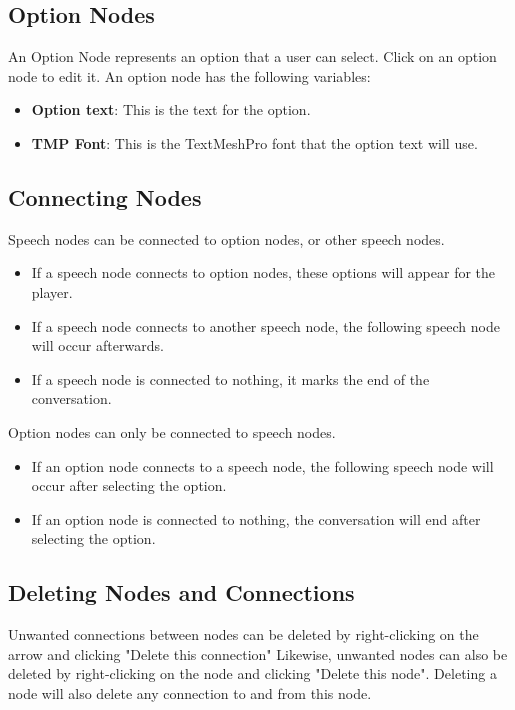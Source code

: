 \documentclass[a4paper,12pt]{article}
\begin{document}
\newpage

\subsection{Option Nodes}
An Option Node represents an option that a user can select.
\newline
Click on an option node to edit it. An option node has the following variables:

\begin{itemize}
\setlength\itemsep{1pt}
	\item \textbf{Option text}: This is the text for the option.
	\item \textbf{TMP Font}: This is the TextMeshPro font that the option text will use.
\end{itemize}

\subsection{Connecting Nodes}

Speech nodes can be connected to option nodes, or other speech nodes. 

\begin{itemize}
\setlength\itemsep{1pt}
	\item If a speech node connects to option nodes, these options will appear for the player.
	\item If a speech node connects to another speech node, the following speech node will occur afterwards.
	\item If a speech node is connected to nothing, it marks the end of the conversation.
\end{itemize}
\bigbreak

Option nodes can only be connected to speech nodes.
\begin{itemize}
\setlength\itemsep{1pt}
	\item If an option node connects to a speech node, the following speech node will occur after selecting the option.
	\item If an option node is connected to nothing, the conversation will end after selecting the option.	
\end{itemize}

\subsection{Deleting Nodes and Connections}
Unwanted connections between nodes can be deleted by right-clicking on the arrow and clicking "Delete this connection"
\newline
Likewise, unwanted nodes can also be deleted by right-clicking on the node and clicking "Delete this node". Deleting a node will also delete any connection to and from this node.
\bigskip 
\end{document}

